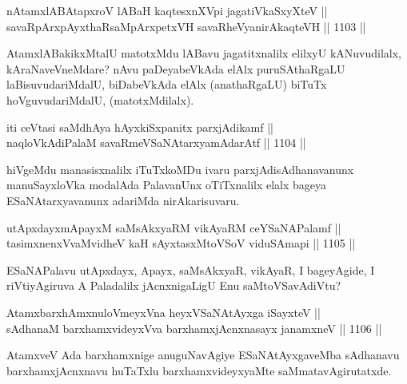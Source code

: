
\begin{shl}
nA\s \s tamxlABAtapxroV lABaH kaqtesxnXV\s pi jagatiVkaSxyXteV || \\
savaRpArxpAyxthaRsaMpArxpetxVH savaRheVyanirAkaqteVH \hfill || 1103 ||  
\end{shl}

\begin{artha}
AtamxlABakikxMtalU matotxMdu lABavu jagatitxnalilx elilxyU kANuvudilalx, kAraNaveVneMdare? nAvu paDeyabeVkAda elAlx puruSAthaRgaLU laBisuvudariMdalU, biDabeVkAda elAlx (anathaRgaLU) biTuTx hoVguvudariMdalU, (matotxMdilalx).
\end{artha}

\begin{shl}
iti ceVtasi saMdhAya hAyxkiSxpanitx parxjAdikamf || \\
naqloVkAdiPalaM savaRmeVSaNAtarxyamAdarAtf \hfill || 1104 ||  
\end{shl}

\begin{artha}
hiVgeMdu manasisxnalilx iTuTxkoMDu ivaru parxjAdisAdhanavanunx manuSayxloVka modalAda PalavanUnx oTiTxnalilx elalx bageya ESaNAtarxyavanunx adariMda nirAkarisuvaru.
\end{artha}


\begin{shl}
utApxdayxmApayxM saMsAkxyaRM vikAyaRM ceYSaNAPalamf || \\
tasimxnenxVvaMvidheV kaH sAyxtasxMtoVSoV viduSAmapi \hfill || 1105 ||  
\end{shl}

\begin{artha}
ESaNAPalavu utApxdayx, Apayx, saMsAkxyaR, vikAyaR, I bageyAgide, I riVtiyAgiruva A Paladalilx jAcnxnigaLigU Enu saMtoVSavAdiVtu?
\end{artha}


\begin{shl}
AtamxbarxhAmxnuloVmeyxVna heyxVSaNAtAyxga iSayxteV || \\
sAdhanaM barxhamxvideyxVva barxhamxjAcnxnasayx janamxneV \hfill || 1106 ||  
\end{shl}

\begin{artha}
AtamxveV Ada barxhamxnige anuguNavAgiye ESaNAtAyxgaveMba sAdhanavu barxhamxjAcnxnavu huTaTxlu barxhamxvideyxyaMte saMmatavAgirutatxde.
\end{artha}

